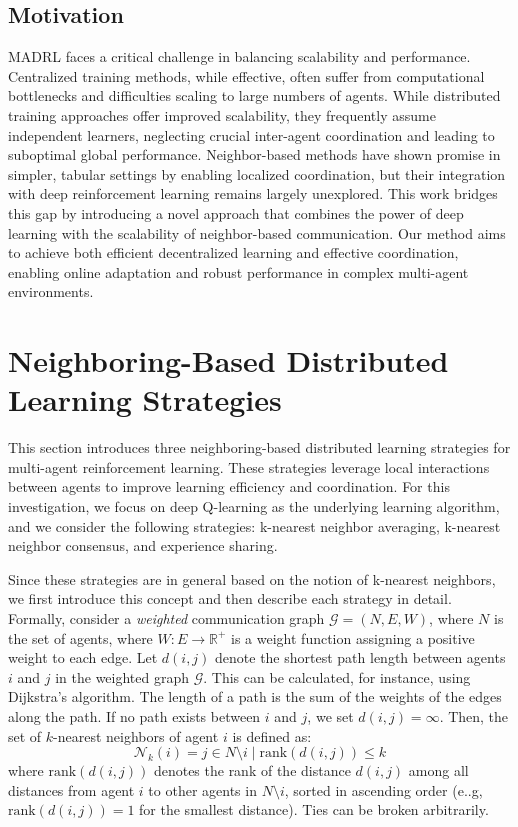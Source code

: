 \documentclass[sigconf]{acmart}
\begin{document}
\subsection{Motivation}
MADRL faces a critical challenge in balancing scalability and performance.  
Centralized training methods, while effective, often suffer from computational bottlenecks and difficulties scaling to large numbers of agents. 
While distributed training approaches offer improved scalability, 
they frequently assume independent learners, 
neglecting crucial inter-agent coordination and leading to suboptimal global performance.  
%
Neighbor-based methods have shown promise in simpler, tabular settings by enabling localized coordination,
but their integration with deep reinforcement learning remains largely unexplored. 
This work bridges this gap by introducing a novel approach that combines the power of deep learning with the scalability of neighbor-based communication.  
Our method aims to achieve both efficient decentralized learning and effective coordination, enabling online adaptation and robust performance in complex multi-agent environments.
\section{Neighboring-Based Distributed Learning Strategies}\label{sec:neighboring}
This section introduces three neighboring-based distributed learning strategies for multi-agent reinforcement learning. 
These strategies leverage local interactions between agents to improve learning efficiency and coordination.
For this investigation, we focus on deep Q-learning as the underlying learning algorithm,
and we consider the following strategies:
 k-nearest neighbor averaging, k-nearest neighbor consensus, and experience sharing.


Since these strategies are in general based on the notion of k-nearest neighbors,
we first introduce this concept and then describe each strategy in detail.
Formally, consider a \emph{weighted} communication graph $\mathcal{G} = (N, E, W)$, where $N$ is the set of agents, where $W: E \rightarrow \mathbb{R}^+$ is a weight function assigning a positive weight to each edge.  
Let $d(i,j)$ denote the shortest path length between agents $i$ and $j$ in the weighted graph $\mathcal{G}$. 
This can be calculated, for instance, using Dijkstra's algorithm. 
The length of a path is the sum of the weights of the edges along the path. If no path exists between $i$ and $j$, we set $d(i,j) = \infty$.
%
Then, the set of $k$-nearest neighbors of agent $i$ is defined as:
$$ \mathcal{N}_k(i) = { j \in N \setminus {i} \mid \text{rank}(d(i,j)) \leq k } $$
where $\text{rank}(d(i,j))$ denotes the rank of the distance $d(i,j)$ among all distances from agent $i$ to other agents in $N \setminus {i}$, sorted in ascending order (e..g, $\text{rank}(d(i,j)) = 1$ for the smallest distance).
Ties can be broken arbitrarily.
\end{document}
